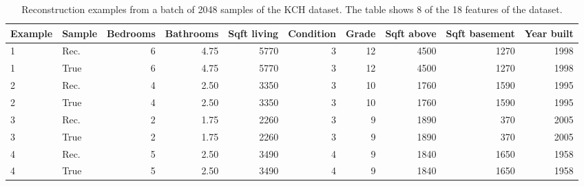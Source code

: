 \begin{table}[h]
\centering
\caption{Reconstruction examples from a batch of 2048 samples of the KCH dataset. The table shows 8 of the 18 features of the dataset.}

\small
\begin{tabular}{llrrrrrrrr}
\toprule
Example & Sample & Bedrooms & Bathrooms & Sqft living & Condition & Grade & Sqft above & Sqft basement & Year built \\
\midrule
1 & Rec. & 6 & 4.75 & 5770 & 3 & 12 & 4500 & 1270 & 1998 \\
1 & True      & 6 & 4.75 & 5770 & 3 & 12 & 4500 & 1270 & 1998 \\
\midrule
2 & Rec. & 4 & 2.50 & 3350 & 3 & 10 & 1760 & 1590 & 1995 \\
2 & True      & 4 & 2.50 & 3350 & 3 & 10 & 1760 & 1590 & 1995 \\
\midrule
3 & Rec. & 2 & 1.75 & 2260 & 3 & 9  & 1890 & 370  & 2005 \\
3 & True      & 2 & 1.75 & 2260 & 3 & 9  & 1890 & 370  & 2005 \\
\midrule
4 & Rec. & 5 & 2.50 & 3490 & 4 & 9  & 1840 & 1650 & 1958 \\
4 & True      & 5 & 2.50 & 3490 & 4 & 9  & 1840 & 1650 & 1958 \\
\bottomrule
\end{tabular}
\label{tab:king-county-reconstructed-originals}
\end{table}
